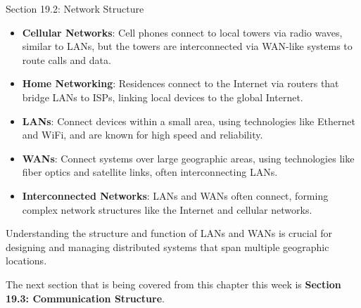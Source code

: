 \begin{notes}{Section 19.2: Network Structure}
    \begin{highlight}
    
        \begin{itemize}
            \item \textbf{Cellular Networks}: Cell phones connect to local towers via radio waves, similar to LANs, but the towers are interconnected via WAN-like systems to route calls and data.
            \item \textbf{Home Networking}: Residences connect to the Internet via routers that bridge LANs to ISPs, linking local devices to the global Internet.
        \end{itemize}
    
    \end{highlight}
    
    \begin{highlight}
    
        \begin{itemize}
            \item \textbf{LANs}: Connect devices within a small area, using technologies like Ethernet and WiFi, and are known for high speed and reliability.
            \item \textbf{WANs}: Connect systems over large geographic areas, using technologies like fiber optics and satellite links, often interconnecting LANs.
            \item \textbf{Interconnected Networks}: LANs and WANs often connect, forming complex network structures like the Internet and cellular networks.
        \end{itemize}
    
    Understanding the structure and function of LANs and WANs is crucial for designing and managing distributed systems that span multiple geographic locations.
    
    \end{highlight}
\end{notes}

The next section that is being covered from this chapter this week is \textbf{Section 19.3: Communication Structure}.

